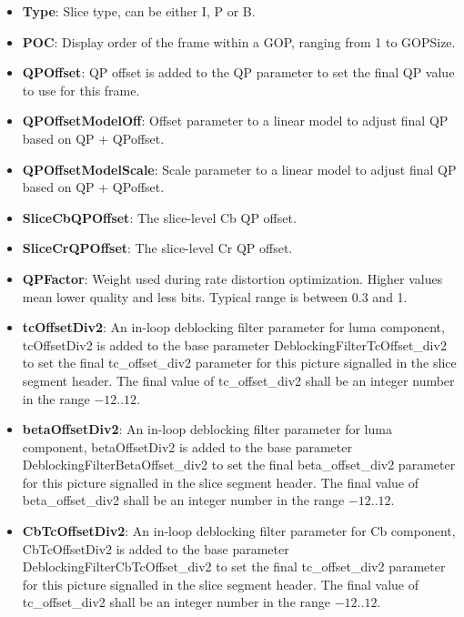 \documentclass[a4paper,11pt]{jvetdoc}
\begin{document}
\begin{itemize}
\item[]\textbf{Type}: Slice type, can be either I, P or B.

\item[]\textbf{POC}: Display order of the frame within a GOP, ranging
from 1 to GOPSize.

\item[]\textbf{QPOffset}: QP offset is added to the QP parameter to set
the final QP value to use for this frame.

\item[]\textbf{QPOffsetModelOff}: Offset parameter to a linear model to adjust final QP based on QP + QPoffset.

\item[]\textbf{QPOffsetModelScale}: Scale parameter to a linear model to adjust final QP based on QP + QPoffset.

\item[]\textbf{SliceCbQPOffset}: The slice-level Cb QP offset.

\item[]\textbf{SliceCrQPOffset}: The slice-level Cr QP offset.

\item[]\textbf{QPFactor}: Weight used during rate distortion
optimization. Higher values mean lower quality and less bits. Typical
range is between
0.3 and 1.

\item[]\textbf{tcOffsetDiv2}: An in-loop deblocking filter parameter for luma component, tcOffsetDiv2 
is added to the base parameter DeblockingFilterTcOffset_div2 to set the final tc_offset_div2 
parameter for this picture signalled in the slice segment header. The final 
value of tc_offset_div2 shall be an integer number in the range $-12..12$.

\item[]\textbf{betaOffsetDiv2}: An in-loop deblocking filter parameter for luma component, betaOffsetDiv2 
is added to the base parameter DeblockingFilterBetaOffset_div2 to set the final beta_offset_div2 
parameter for this picture signalled in the slice segment header. The final 
value of beta_offset_div2 shall be an integer number in the range $-12..12$.

\item[]\textbf{CbTcOffsetDiv2}: An in-loop deblocking filter parameter for Cb component, CbTcOffsetDiv2 
is added to the base parameter DeblockingFilterCbTcOffset_div2 to set the final tc_offset_div2 
parameter for this picture signalled in the slice segment header. The final 
value of tc_offset_div2 shall be an integer number in the range $-12..12$.


\end{itemize}
\end{document}
